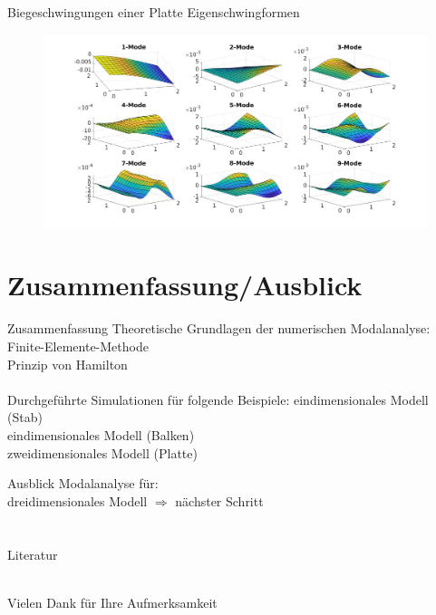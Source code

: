 \begin{frame}{Biegeschwingungen einer Platte}
	Eigenschwingformen
	\begin{figure}
		\centering
		\includegraphics[width=1.0\linewidth, height=0.8\textheight]{Platten_RB_15}
	\end{figure}
\end{frame}




\section{Zusammenfassung/Ausblick}
\begin{frame}
	\begin{alertblock}{Zusammenfassung}
		Theoretische Grundlagen der numerischen Modalanalyse:\\
		\XBox Finite-Elemente-Methode\\
		\XBox Prinzip von Hamilton\\
		\ \\ 
		Durchgeführte Simulationen für folgende Beispiele:
		\XBox eindimensionales Modell (Stab)\\
		\XBox eindimensionales Modell (Balken)\\
		\XBox zweidimensionales Modell (Platte) \\	
	\end{alertblock}

	\pause
	
	\begin{TUBAFoutblock}{Ausblick}
		Modalanalyse für: \\ 
		\Square dreidimensionales Modell $ \Rightarrow $ nächster Schritt 
	\end{TUBAFoutblock}
\end{frame}

\section{ }
\begin{frame}[allowframebreaks]{Literatur}
	\nocite{*}
	
\end{frame}

\begin{frame}{ \ }
{\LARGE 
	\ \\
	Vielen Dank für Ihre Aufmerksamkeit}
\end{frame}


